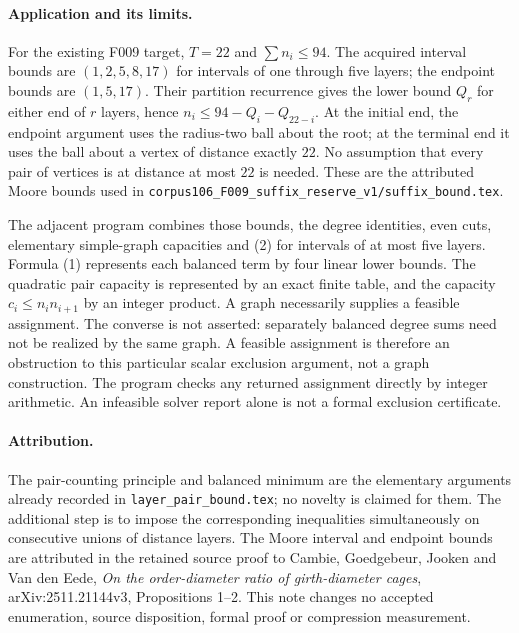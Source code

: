 \documentclass[11pt]{article}
\begin{document}
\paragraph{Application and its limits.}
For the existing F009 target, $T=22$ and $\sum n_i\leq94$.
The acquired interval bounds are $(1,2,5,8,17)$ for intervals of one
through five layers; the endpoint bounds are $(1,5,17)$.
Their partition recurrence gives the lower bound $Q_r$ for either end
of $r$ layers, hence $n_i\leq94-Q_i-Q_{22-i}$. At the initial end,
the endpoint argument uses the radius-two ball about the root; at the
terminal end it uses the ball about a vertex of distance exactly $22$.
No assumption that every pair of vertices is at distance at most $22$
is needed. These are the attributed Moore bounds used in
\texttt{corpus106\_F009\_suffix\_reserve\_v1/suffix\_bound.tex}.

The adjacent program combines those bounds, the degree identities,
even cuts, elementary simple-graph capacities and (2) for intervals of
at most five layers. Formula (1) represents each balanced term by four
linear lower bounds. The quadratic pair capacity is represented by an
exact finite table, and the capacity $c_i\leq n_i n_{i+1}$ by an integer
product. A graph necessarily supplies a feasible assignment. The converse
is not asserted: separately balanced degree sums need not be realized by
the same graph. A feasible assignment is therefore an obstruction to this
particular scalar exclusion argument, not a graph construction. The
program checks any returned assignment directly by integer arithmetic.
An infeasible solver report alone is not a formal exclusion certificate.

\paragraph{Attribution.}
The pair-counting principle and balanced minimum are the elementary
arguments already recorded in \texttt{layer\_pair\_bound.tex}; no novelty
is claimed for them. The additional step is to impose the corresponding
inequalities simultaneously on consecutive unions of distance layers.
The Moore interval and endpoint bounds are attributed in the retained
source proof to Cambie, Goedgebeur, Jooken and Van den Eede,
\emph{On the order-diameter ratio of girth-diameter cages},
arXiv:2511.21144v3, Propositions 1--2. This note changes no accepted
enumeration, source disposition, formal proof or compression measurement.
\end{document}
